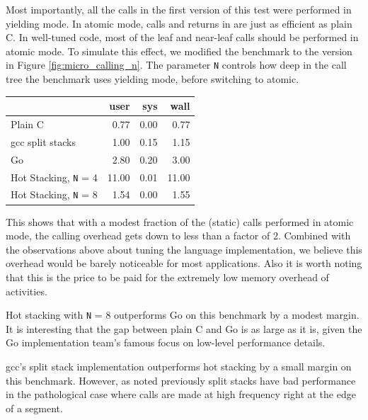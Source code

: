 \documentclass[sigplan,10pt,review,anonymous]{acmart}\settopmatter{printfolios=true,printccs=false,printacmref=false}
\begin{document}
Most importantly, all the calls in the first version of this test were performed in yielding mode.
In atomic mode, calls and returns in \charcoal{} are just as efficient as plain C.
In well-tuned \charcoal{} code, most of the leaf and near-leaf calls should be performed in atomic mode.
To simulate this effect, we modified the benchmark to the version in Figure \ref{fig:micro_calling_n}.
The parameter \texttt{N} controls how deep in the call tree the benchmark uses yielding mode, before switching to atomic.

\vspace{1em}
\begin{tabular}{|l|r|r|r|}
  \hline
   & user & sys & wall \\
  \hline
  \hline
  Plain C & 0.77 & 0.00 & 0.77 \\
  \hline
  gcc split stacks\footnotemark{} & 1.00 & 0.15 & 1.15 \\
  \hline
  Go & 2.80 & 0.20 & 3.00 \\
  \hline
  Hot Stacking, \texttt{N} = 4 & 11.00 & 0.01 & 11.00 \\
  \hline
  Hot Stacking, \texttt{N} = 8 & 1.54 & 0.00 & 1.55 \\
  \hline
\end{tabular}
\vspace{1em}


This shows that with a modest fraction of the (static) calls performed in atomic mode, the calling overhead gets down to less than a factor of 2.
Combined with the observations above about tuning the language implementation, we believe this overhead would be barely noticeable for most applications.
Also it is worth noting that this is the price to be paid for the extremely low memory overhead of activities.

Hot stacking with \texttt{N} = 8 outperforms Go on this benchmark by a modest margin.
It is interesting that the gap between plain C and Go is as large as it is, given the Go implementation team's famous focus on low-level performance details.

gcc's split stack implementation outperforms hot stacking by a small margin on this benchmark.
However, as noted previously split stacks have bad performance in the pathological case where calls are made at high frequency right at the edge of a segment.
\end{document}
